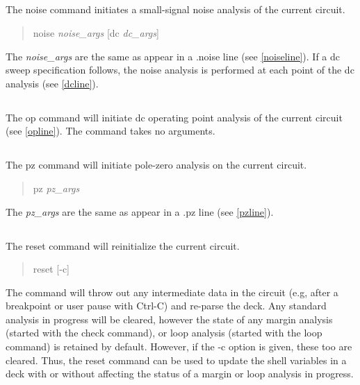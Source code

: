 \subsection{}


The {\cb noise} command initiates a small-signal noise analysis of the
current circuit.
\begin{quote}\vt
noise {\it noise\_args} [dc {\it dc\_args\/}]
\end{quote}
The {\it noise\_args} are the same as appear in a {\vt .noise} line
(see \ref{noiseline}).  If a dc sweep specification follows, the noise
analysis is performed at each point of the dc analysis (see
\ref{dcline}).

\subsection{}


The {\cb op} command will initiate dc operating point analysis of the
current circuit (see \ref{opline}).  The command takes no arguments.

\subsection{}


The {\cb pz} command will initiate pole-zero analysis on the current
circuit.
\begin{quote}\vt
pz {\it pz\_args}
\end{quote}
The {\it pz\_args} are the same as appear in a {\vt .pz} line (see
\ref{pzline}).

\subsection{}


The {\cb reset} command will reinitialize the current circuit.
\begin{quote}\vt
reset [-c]
\end{quote}
The command will throw out any intermediate data in the circuit (e.g,
after a breakpoint or user pause with {\kb Ctrl-C}) and re-parse the
deck.  Any standard analysis in progress will be cleared, however the
state of any margin analysis (started with the {\cb check} command),
or loop analysis (started with the {\cb loop} command) is retained by
default.  However, if the {\vt -c} option is given, these too are
cleared.  Thus, the {\cb reset} command can be used to update the
shell variables in a deck with or without affecting the status of a
margin or loop analysis in progress.

